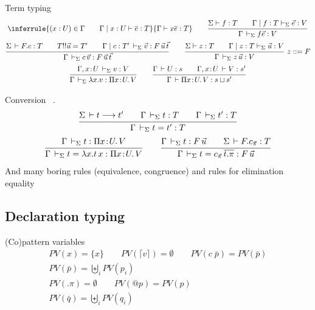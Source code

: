\documentclass[acmlarge,fleqn]{acmart}\settopmatter{}
\renewcommand{\|}{\mid}
\begin{document}
Term typing 
\begin{gather*}
\inferrule
  {(x:U)\in \Gamma \qquad \Gamma \mid x:U \vdash \overline{e}:T}
  {\Gamma \vdash x \overline{e} : T}
\qquad
\ru{\Sigma \vdash f : T \qquad
    \Gamma \mid f : T \vdash_\Sigma \vec e : V
   }{\Gamma \der_\Sigma f \vec e : V}
\\
\ru{\Sigma \der F.c : T \qquad
    T !! \vec u = T' \qquad
    \Gamma \mid c : T' \der_\Sigma \vec v : F \, \vec u \, \vec t
  }{\Gamma \der_\Sigma c\,\vec v : F\,\vec u\,\vec t}
\qquad
\ru{\Sigma \vdash z : T \qquad
    \Gamma \mid z : T \vdash_\Sigma \vec u : V
   }{\Gamma \der_\Sigma z \, \vec u : V} \ z ::= F
\\
\ru{\Gamma, x \of U \der_\Sigma v : V
  }{\Gamma \der_\Sigma \lambda x.v : \funT x U V}
\qquad
\ru{\Gamma \der U : s \qquad
    \Gamma, x \of U \der V : s'
  }{\Gamma \der \piT x U V : s \sqcup s'}
\end{gather*}


Conversion
\ .
\begin{gather*}
%
\ru{\Sigma \der t \red t' \qquad
    \Gamma \ders t : T \qquad
    \Gamma \ders t' : T
  }{\Gamma \ders t = t' : T}
\\
\ru{\Gamma \ders t : \funT x U V
  }{\Gamma \ders t = \lambda x. t\, x : \funT x U V}
\qquad
\ru{\Gamma \ders t : F\, \vec u \qquad
    \Sigma \der F.\cpi : T
  }{\Gamma \ders t = \cpi\,\overline{t .\pi} : F\,\vec u}
\\
\end{gather*}
And many boring rules (equivalence, congruence)
and rules for elimination equality


\subsection{Declaration typing}

(Co)pattern variables 
\begin{gather*}
PV(x) = \{ x \} \qquad PV (\lceil v \rceil) = \emptyset \qquad PV(c\; \bar{p}) = PV(\bar{p}) \\
PV(\bar{p}) = \biguplus_i PV(p_i) \\
PV(.\pi) = \emptyset \qquad PV(@p) = PV(p) \\
PV(\bar{q}) = \biguplus_i PV(q_i) \\
\end{gather*}
\end{document}
